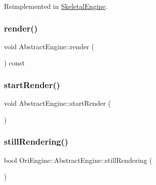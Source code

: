 Reimplemented in \hyperlink{class_skeletal_engine_a9d3352322b1c4c8aa6332765e8efcde6}{Skeletal\+Engine}.

\hypertarget{class_ori_engine_1_1_abstract_engine_aa88ad7f1c4168f03139f33d467b0a9d0}{}\label{class_ori_engine_1_1_abstract_engine_aa88ad7f1c4168f03139f33d467b0a9d0} 
\subsubsection{\texorpdfstring{render()}{render()}}
{\footnotesize\ttfamily void Abstract\+Engine\+::render (\begin{DoxyParamCaption}{ }\end{DoxyParamCaption}) const}

\hypertarget{class_ori_engine_1_1_abstract_engine_ae406e1718ed7da4d0ff074f91bd2d4b7}{}\label{class_ori_engine_1_1_abstract_engine_ae406e1718ed7da4d0ff074f91bd2d4b7} 
\subsubsection{\texorpdfstring{start\+Render()}{startRender()}}
{\footnotesize\ttfamily void Abstract\+Engine\+::start\+Render (\begin{DoxyParamCaption}{ }\end{DoxyParamCaption})}

\hypertarget{class_ori_engine_1_1_abstract_engine_af02f0fa50c8ef658e3ff892aa8d8a264}{}\label{class_ori_engine_1_1_abstract_engine_af02f0fa50c8ef658e3ff892aa8d8a264} 
\subsubsection{\texorpdfstring{still\+Rendering()}{stillRendering()}}
{\footnotesize\ttfamily bool Ori\+Engine\+::\+Abstract\+Engine\+::still\+Rendering (\begin{DoxyParamCaption}{ }\end{DoxyParamCaption})\hspace{0.3cm}{\ttfamily [inline]}}



